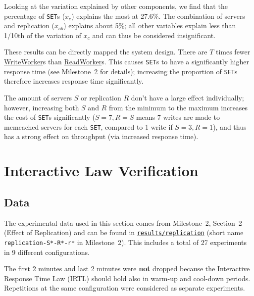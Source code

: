 \documentclass[11pt]{article}
\newcommand{\set}[0]{\texttt{SET}}
\newcommand{\linkmain}[1]{\href{https://gitlab.inf.ethz.ch/pungast/asl-fall16-project/blob/master/src/main/java/asl/#1.java}{#1}}
\begin{document}
Looking at the variation explained by other components, we find that the percentage of \set{}s ($x_c$) explains the most at 27.6\%. The combination of servers and replication ($x_{ab}$) explains about 5\%; all other variables explain less than 1/10th of the variation of $x_c$ and can thus be considered insignificant.

These results can be directly mapped the system design. There are $T$ times fewer \linkmain{WriteWorker}s than \linkmain{ReadWorker}s. This causes \set{}s to have a significantly higher response time (see Milestone~2 for details); increasing the proportion of \set{}s therefore increases response time significantly.

The amount of servers $S$ or replication $R$ don't have a large effect individually; however, increasing both $S$ and $R$ from the minimum to the maximum increases the cost of \set{}s significantly ($S=7,R=S$ means 7 writes are made to memcached servers for each \set{}, compared to 1 write if $S=3,R=1$), and thus has a strong effect on throughput (via increased response time).

\clearpage
\section{Interactive Law Verification}\label{sec:part5-interactive-law}

\subsection{Data}

The experimental data used in this section comes from Milestone~2, Section~2 (Effect of Replication) and can be found in \texttt{\href{https://gitlab.inf.ethz.ch/pungast/asl-fall16-project/tree/master/results/replication}{results/replication}} (short name \texttt{replication-S*-R*-r*} in Milestone~2). This includes a total of 27 experiments in 9 different configurations.

The first 2 minutes and last 2 minutes were \textbf{not} dropped because the Interactive Response Time Law (IRTL) should hold also in warm-up and cool-down periods. Repetitions at the same configuration were considered as separate experiments.
\end{document}
